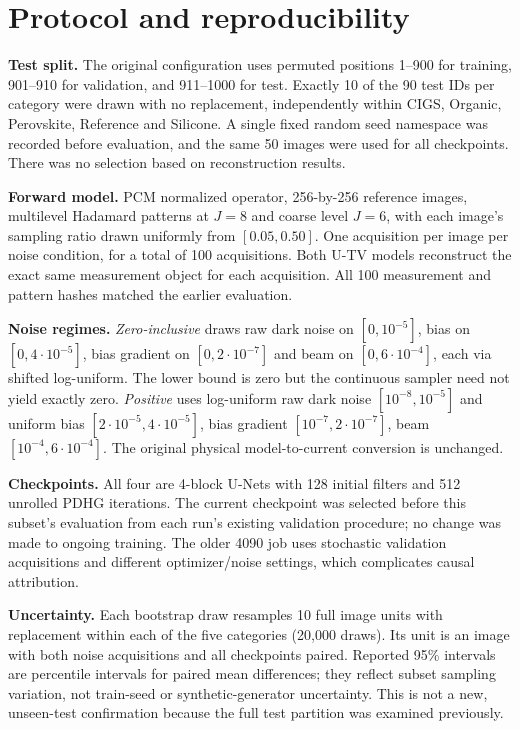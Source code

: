 \documentclass[11pt,a4paper]{article}
\begin{document}
\section{Protocol and reproducibility}
\textbf{Test split.} The original configuration uses permuted positions 1--900 for training, 901--910 for validation, and 911--1000 for test. Exactly 10 of the 90 test IDs per category were drawn with no replacement, independently within CIGS, Organic, Perovskite, Reference and Silicone. A single fixed random seed namespace was recorded before evaluation, and the same 50 images were used for all checkpoints. There was no selection based on reconstruction results.

\textbf{Forward model.} PCM normalized operator, 256-by-256 reference images, multilevel Hadamard patterns at $J=8$ and coarse level $J=6$, with each image's sampling ratio drawn uniformly from $[0.05,0.50]$. One acquisition per image per noise condition, for a total of 100 acquisitions. Both U-TV models reconstruct the exact same measurement object for each acquisition. All 100 measurement and pattern hashes matched the earlier evaluation.

\textbf{Noise regimes.} \emph{Zero-inclusive} draws raw dark noise on $[0,10^{-5}]$, bias on $[0,4\cdot 10^{-5}]$, bias gradient on $[0,2\cdot10^{-7}]$ and beam on $[0,6\cdot10^{-4}]$, each via shifted log-uniform. The lower bound is zero but the continuous sampler need not yield exactly zero. \emph{Positive} uses log-uniform raw dark noise $[10^{-8},10^{-5}]$ and uniform bias $[2\cdot10^{-5},4\cdot10^{-5}]$, bias gradient $[10^{-7},2\cdot10^{-7}]$, beam $[10^{-4},6\cdot10^{-4}]$. The original physical model-to-current conversion is unchanged.

\textbf{Checkpoints.} All four are 4-block U-Nets with 128 initial filters and 512 unrolled PDHG iterations. The current checkpoint was selected before this subset's evaluation from each run's existing validation procedure; no change was made to ongoing training. The older 4090 job uses stochastic validation acquisitions and different optimizer/noise settings, which complicates causal attribution.

\textbf{Uncertainty.} Each bootstrap draw resamples 10 full image units with replacement within each of the five categories (20,000 draws). Its unit is an image with both noise acquisitions and all checkpoints paired. Reported 95\% intervals are percentile intervals for paired mean differences; they reflect subset sampling variation, not train-seed or synthetic-generator uncertainty. This is not a new, unseen-test confirmation because the full test partition was examined previously.
\end{document}

